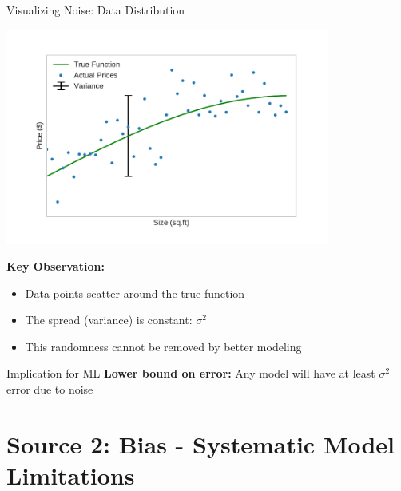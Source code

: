 \documentclass[10pt]{beamer}
\newcommand{\fitpic}[1]{\begin{adjustbox}{max width=\linewidth, max totalheight=0.78\textheight}#1\end{adjustbox}}
\begin{document}
\begin{frame}{Visualizing Noise: Data Distribution}
\begin{center}
\fitpic{\includegraphics[width=0.8\textwidth]{../assets/bias-variance/figures/data_var.pdf}}
\end{center}

\begin{keypointsbox}
\textbf{Key Observation:} 
\begin{itemize}
\item Data points scatter around the true function
\item The spread (variance) is constant: $\sigma^2$
\item This randomness cannot be removed by better modeling
\end{itemize}
\end{keypointsbox}

\begin{alertbox}{Implication for ML}
\textbf{Lower bound on error:} Any model will have at least $\sigma^2$ error due to noise
\end{alertbox}
\end{frame}

\section{Source 2: Bias - Systematic Model Limitations}
\end{document}
